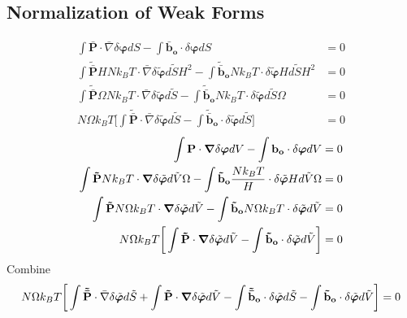 \documentclass[12pt,3p]{article}
\numberwithin{equation}{section}
\begin{document}
\subsection{Normalization of Weak Forms}
\begin{align*}
\int \mathbf{\bar{P}} \cdot \bar{\nabla} \delta \boldsymbol\varphi dS - \int \mathbf{\bar{b}_o} \cdot \delta \boldsymbol\varphi dS &= 0 \\
\int \mathbf{\tilde{\bar{P}}}H N k_B T \cdot \bar{\nabla} \delta \tilde{\boldsymbol\varphi} d\tilde{S} H^2 - \int \mathbf{\tilde{\bar{b}}_o} N k_B T \cdot \delta \tilde{\boldsymbol\varphi} H d \tilde{S} H^2 &= 0 \\
\int \mathbf{\tilde{\bar{P}}} \Omega N k_B T \cdot \bar{\nabla} \delta \tilde{\boldsymbol\varphi} d\tilde{S} - \int \mathbf{\tilde{\bar{b}}_o} N k_B T \cdot \delta \tilde{\boldsymbol\varphi} d \tilde{S} \Omega &= 0 \\
N \Omega k_B T \bigg[ \int \mathbf{\tilde{\bar{P}}} \cdot \bar{\nabla} \delta \tilde{\boldsymbol\varphi} d\tilde{S} - \int \mathbf{\tilde{\bar{b}}_o} \cdot \delta \tilde{\boldsymbol\varphi} d \tilde{S} \bigg] &= 0 
\end{align*}
\begin{align*}
\int \mathbf{P} \cdot \grad \delta \boldsymbol\varphi dV - \int \mathbf{b_o} \cdot \delta \boldsymbol\varphi dV &= 0\\
\int \mathbf{\tilde{P}} N k_B T \cdot \grad \delta \tilde{\boldsymbol\varphi} d\tilde{V} \Omega - \int \mathbf{\tilde{b}_o} \frac{N k_B T}{H} \cdot \delta \tilde{\boldsymbol\varphi} H d\tilde{V} \Omega &= 0 \\
\int \mathbf{\tilde{P}} N \Omega k_B T \cdot \grad \delta \tilde{\boldsymbol\varphi} d\tilde{V} - \int \mathbf{\tilde{b}_o} N \Omega k_B T \cdot \delta \tilde{\boldsymbol\varphi} d\tilde{V} &= 0 \\
N \Omega k_B T \bigg[ \int \mathbf{\tilde{P}}  \cdot \grad \delta \tilde{\boldsymbol\varphi} d\tilde{V} - \int \mathbf{\tilde{b}_o} \cdot \delta \tilde{\boldsymbol\varphi} d\tilde{V} \bigg] &= 0 
\end{align*}
Combine
\begin{align*}
N \Omega k_B T \bigg[ \int \mathbf{\tilde{\bar{P}}} \cdot \bar{\nabla} \delta \tilde{\boldsymbol\varphi} d\tilde{S} + \int \mathbf{\tilde{P}}  \cdot \grad \delta \tilde{\boldsymbol\varphi} d\tilde{V} - \int \mathbf{\tilde{\bar{b}}_o} \cdot \delta \tilde{\boldsymbol\varphi} d \tilde{S} - \int \mathbf{\tilde{b}_o} \cdot \delta \tilde{\boldsymbol\varphi} d\tilde{V} \bigg] &= 0 \\
\end{align*}
\end{document}
